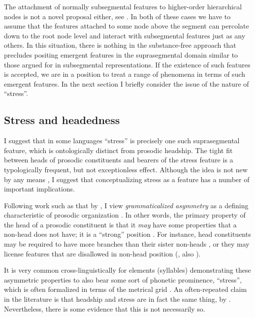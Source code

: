 The attachment of normally subsegmental features to higher\hyp order hierarchical nodes is not a novel proposal either, see \eg \citet{lodge93:_under,Lodge2003931,lodge07:_timin_icelan,kehrein,kehrein04}. In both of these cases we have to assume that the features attached to some node above the segment can percolate down to the root node level and interact with subsegmental features just as any others. In this situation, there is nothing in the substance\hyp free approach that precludes positing emergent features in the suprasegmental domain similar to those argued for in subsegmental representations. If the existence of such features is accepted, we are in a position to treat a range of phenomena in terms of such emergent features. In the next section I briefly consider the issue of the nature of \enquote{stress}.

\subsection{Stress and headedness}
\label{sec:stress-headedness}

I suggest that in some languages \enquote{stress} is precisely one such suprasegmental feature, which is ontologically distinct from prosodic headship. The tight fit between heads of prosodic constituents and bearers of the stress feature is a typologically frequent, but not exceptionless effect. Although the idea is not new by any means \citep[\egm][]{crowhurst-hewitt1995,hyde,hyde06:_towar,vaysman08,buckley09:_local}, I suggest that conceptualizing stress as a feature has a number of important implications.

Following work such as that by \citet{dresher-vdhulst}, I view \emph{grammaticalized asymmetry} as a defining characteristic of prosodic organization \citep[\cf also][]{curt-diss,rice07,weijer96:_segmen,mellander04:_hl}. In other words, the primary property of the head of a prosodic constituent is that it \emph{may} have some properties that a non\hyp head does not have; it is a \enquote{strong} position \citep[\egm][]{smith-diss,smith04:_makin,teeple09:_bicon}. For instance, head constituents may be required to have more branches than their sister non\hyp heads \citep{dresher-vdhulst,mellander04:_hl}, or they may license features that are disallowed in non\hyp head position (\citealp{harris97:_licen_inher,harris05:_vowel_reduction,harris-urua}, \cf also \citealt{iosad10:_motiv}).

It is very common cross\hyp linguistically for elements (\eg syllables) demonstrating these asymmetric properties to also bear some sort of phonetic prominence, \ie \enquote{stress}, which is often formalized in terms of the metrical grid \citep[\egm][]{prince1983,halle-vergnaud,hayes1995,hyde}. An often\hyp repeated claim in the literature is that headship and stress are in fact the same thing, \eg by \citet{halle-vergnaud}. Nevertheless, there is some evidence that this is not necessarily so.

